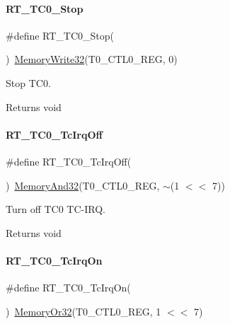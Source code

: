 \paragraph{\texorpdfstring{R\+T\+\_\+\+T\+C0\+\_\+\+Stop}{RT\_TC0\_Stop}}
{\footnotesize\ttfamily \#define R\+T\+\_\+\+T\+C0\+\_\+\+Stop(\begin{DoxyParamCaption}{ }\end{DoxyParamCaption})~\mbox{\hyperlink{a00020_ad9953f631a539cfaa35baf94f878b3ec}{Memory\+Write32}}(T0\+\_\+\+C\+T\+L0\+\_\+\+R\+EG, 0)}



Stop T\+C0. 

\begin{DoxyReturn}{Returns}
void 
\end{DoxyReturn}
\mbox{\label{a00041_a7434ed75487de93c69569c05430967ae}} 
\paragraph{\texorpdfstring{R\+T\+\_\+\+T\+C0\+\_\+\+Tc\+Irq\+Off}{RT\_TC0\_TcIrqOff}}
{\footnotesize\ttfamily \#define R\+T\+\_\+\+T\+C0\+\_\+\+Tc\+Irq\+Off(\begin{DoxyParamCaption}{ }\end{DoxyParamCaption})~\mbox{\hyperlink{a00020_a5c1a2bd4c1bd4c2f429d8042a45327ff}{Memory\+And32}}(T0\+\_\+\+C\+T\+L0\+\_\+\+R\+EG, $\sim$(1 $<$$<$ 7))}



Turn off T\+C0 T\+C-\/\+I\+RQ. 

\begin{DoxyReturn}{Returns}
void 
\end{DoxyReturn}
\mbox{\label{a00041_a1ff15e860147b3fff582b7603ba7ffa8}} 
\paragraph{\texorpdfstring{R\+T\+\_\+\+T\+C0\+\_\+\+Tc\+Irq\+On}{RT\_TC0\_TcIrqOn}}
{\footnotesize\ttfamily \#define R\+T\+\_\+\+T\+C0\+\_\+\+Tc\+Irq\+On(\begin{DoxyParamCaption}{ }\end{DoxyParamCaption})~\mbox{\hyperlink{a00020_a9ea92ebccdef6bdaca4d00210cc7266d}{Memory\+Or32}}(T0\+\_\+\+C\+T\+L0\+\_\+\+R\+EG, 1 $<$$<$ 7)}



